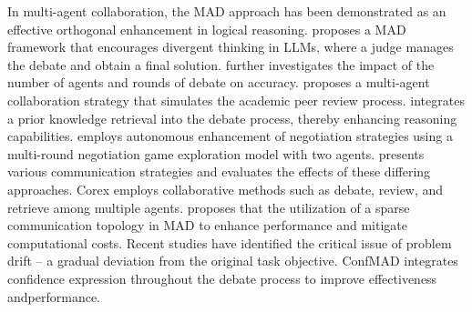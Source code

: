 In multi-agent collaboration, the MAD approach has been demonstrated as an effective orthogonal enhancement in logical reasoning. \cite{liang2023encouraging} proposes a MAD framework that encourages divergent thinking in LLMs, where a judge manages the debate and obtain a final solution. 
\cite{du2023improving} further investigates the impact of the number of agents and rounds of debate on accuracy. \cite{xu2023toward} proposes a multi-agent collaboration strategy that simulates the academic peer review process. \cite{wang2023apollo} integrates a prior knowledge retrieval into the debate process, thereby enhancing reasoning capabilities. \cite{fu2023improving} employs autonomous enhancement of negotiation strategies using a multi-round negotiation game exploration model with two agents. \cite{chan2023chateval} presents various communication strategies and evaluates the effects of these differing approaches. Corex \cite{sun2023corex} employs collaborative methods such as debate, review, and retrieve among multiple agents. \cite{li2024improving} proposes that the utilization of a sparse communication topology in MAD to enhance performance and mitigate computational costs. Recent studies \cite{becker2025stayfocusedproblemdrift} have identified the critical issue of problem drift – a gradual deviation from the original task objective. ConfMAD \cite{lin2025enhancingmultiagentdebateperformance} integrates confidence expression throughout the debate process to improve effectiveness andperformance. 